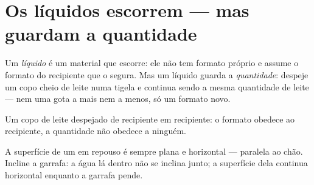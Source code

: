 \section{Os líquidos escorrem --- mas guardam a quantidade}

\begin{definition}[Líquido]\label{def:g3:solids-liquids-gases:liquid}
Um \emph{líquido} é um material que escorre: ele não
tem formato próprio e assume o formato do recipiente que o segura.
Mas um líquido guarda a \emph{quantidade}: despeje um copo cheio de
leite numa tigela e continua sendo a mesma quantidade de leite ---
nem uma gota a mais nem a menos, só um formato novo.
\end{definition}

\begin{omfigure}

{\small Um copo de leite despejado de recipiente em recipiente: o
formato obedece ao recipiente, a quantidade não obedece a ninguém.}
\end{omfigure}

\begin{proposition}\label{prop:g3:solids-liquids-gases:level}
A superfície de um  em repouso é sempre plana e horizontal ---
paralela ao chão. Incline a garrafa: a água lá dentro não se inclina
junto; a superfície dela continua horizontal enquanto a garrafa
pende.
\end{proposition}

